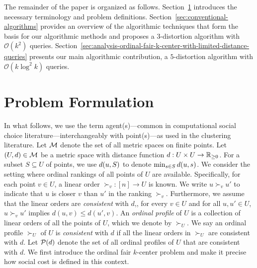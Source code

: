 \documentclass{article}
\newcommand{\bigO}{\ensuremath{\mathcal{O}}\xspace}
\begin{document}
The remainder of the paper is organized as follows. 
Section~\ref{sec:problem-formulation} introduces the necessary terminology and problem definitions. 
Section~\ref{sec:conventional-algorithms} provides an overview of the algorithmic techniques that form the basis for our algorithmic methods and proposes a $3$-distortion algorithm with $\bigO(k^2)$ queries.
Section~\ref{sec:analysis-ordinal-fair-k-center-with-limited-distance-queries} presents our main algorithmic contribution, a $5$-distortion algorithm with $\bigO(k\log^2 k)$ queries.


 









\section{Problem Formulation}
\label{sec:problem-formulation}

In what follows, we use the term agent(s)---common in computational social choice literature---interchangeably with point(s)---as used in the clustering literature. 
Let $\mathcal{M}$ denote the set of all metric spaces on finite points.
Let $(U, d) \in \mathcal{M}$ be a metric space with distance function $d: U \times U \rightarrow \mathbb{R}_{\ge 0}$.
For a subset $S \subseteq U$ of points, we use $d(u,S)$ to denote $\min_{s \in S} d(u, s)$. 
We consider the setting where ordinal rankings of all points of $U$ are available. 
Specifically, for each point $v \in U$, a linear order $\succ_v: [n] \rightarrow U$ is known. We write $u \succ_{v} u'$ to indicate that $u$ is closer $v$ than $u'$ in the ranking $\succ_v$. 
Furthermore, we assume that the linear orders are \emph{consistent} with $d$,\ie, for every $v \in U$ and for all $u, u' \in U$, $u \succ_v u'$ implies $d(u, v) \leq d(u', v)$. 
An \emph{ordinal profile} of $U$ is a collection of linear orders of all the points of $U$, which we denote by $\succ_U$.
We say an ordinal profile $\succ_U$ of $U$ is \emph{consistent} with $d$ if all the linear orders in $\succ_U$ are consistent with $d$.
Let $\mathcal{P}(d)$ denote the set of all ordinal profiles of $U$ that are consistent with $d$.
We first introduce the ordinal fair $k$-center problem and make it precise how social cost is defined in this context.
\end{document}
